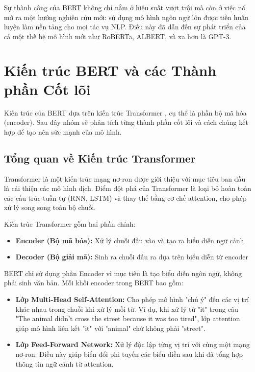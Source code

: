 Sự thành công của BERT không chỉ nằm ở hiệu suất vượt trội mà còn ở việc nó mở ra một hướng nghiên cứu mới: sử dụng mô hình ngôn ngữ lớn được tiền huấn luyện làm nền tảng cho mọi tác vụ NLP. Điều này đã dẫn đến sự phát triển của cả một thế hệ mô hình mới như RoBERTa, ALBERT, và xa hơn là GPT-3.

\section{Kiến trúc BERT và các Thành phần Cốt lõi}
\label{sec:kien_truc_bert}
Kiến trúc của BERT dựa trên kiến trúc Transformer \cite{vaswani2017attention}, cụ thể là phần bộ mã hóa (encoder). Sau đây nhóm sẽ phân tích từng thành phần cốt lõi và cách chúng kết hợp để tạo nên sức mạnh của mô hình.

\subsection{Tổng quan về Kiến trúc Transformer}
\label{ssec:tong_quan_transformer}
Transformer là một kiến trúc mạng nơ-ron được giới thiệu với mục tiêu ban đầu là cải thiện các mô hình dịch. Điểm đột phá của Transformer là loại bỏ hoàn toàn các cấu trúc tuần tự (RNN, LSTM) và thay thế bằng cơ chế attention, cho phép xử lý song song toàn bộ chuỗi.

Kiến trúc Transformer gồm hai phần chính:
\begin{itemize}
    \item \textbf{Encoder (Bộ mã hóa):} Xử lý chuỗi đầu vào và tạo ra biểu diễn ngữ cảnh
    \item \textbf{Decoder (Bộ giải mã):} Sinh ra chuỗi đầu ra dựa trên biểu diễn từ encoder
\end{itemize}

BERT chỉ sử dụng phần Encoder vì mục tiêu là tạo biểu diễn ngôn ngữ, không phải sinh văn bản. Mỗi khối encoder trong BERT bao gồm:
\begin{itemize}
    \item \textbf{Lớp Multi-Head Self-Attention:} Cho phép mô hình "chú ý" đến các vị trí khác nhau trong chuỗi khi xử lý mỗi từ. Ví dụ, khi xử lý từ "it" trong câu "The animal didn't cross the street because it was too tired", lớp attention giúp mô hình liên kết "it" với "animal" chứ không phải "street".
    
    \item \textbf{Lớp Feed-Forward Network:} Xử lý độc lập từng vị trí với cùng một mạng nơ-ron. Điều này giúp biến đổi phi tuyến các biểu diễn sau khi đã tổng hợp thông tin ngữ cảnh từ attention.
\end{itemize}

